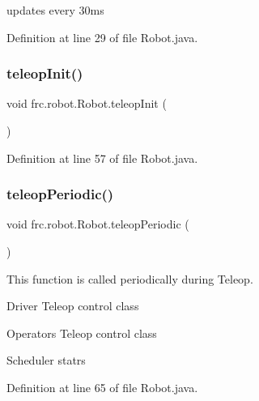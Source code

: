 updates every 30ms 

Definition at line 29 of file Robot.\+java.

\mbox{\label{classfrc_1_1robot_1_1Robot_a209dbf07bfec75d73fa53126a8e31b88}} 
\subsubsection{\texorpdfstring{teleop\+Init()}{teleopInit()}}
{\footnotesize\ttfamily void frc.\+robot.\+Robot.\+teleop\+Init (\begin{DoxyParamCaption}{ }\end{DoxyParamCaption})}



Definition at line 57 of file Robot.\+java.

\mbox{\label{classfrc_1_1robot_1_1Robot_ae807171661cbc29081bc10f06d6831e7}} 
\subsubsection{\texorpdfstring{teleop\+Periodic()}{teleopPeriodic()}}
{\footnotesize\ttfamily void frc.\+robot.\+Robot.\+teleop\+Periodic (\begin{DoxyParamCaption}{ }\end{DoxyParamCaption})}



This function is called periodically during Teleop. 

Driver Teleop control class

Operators Teleop control class

Scheduler statrs 

Definition at line 65 of file Robot.\+java.

\mbox{\label{classfrc_1_1robot_1_1Robot_abd152f34b9f33d5cdf835aa61331f33e}} 
